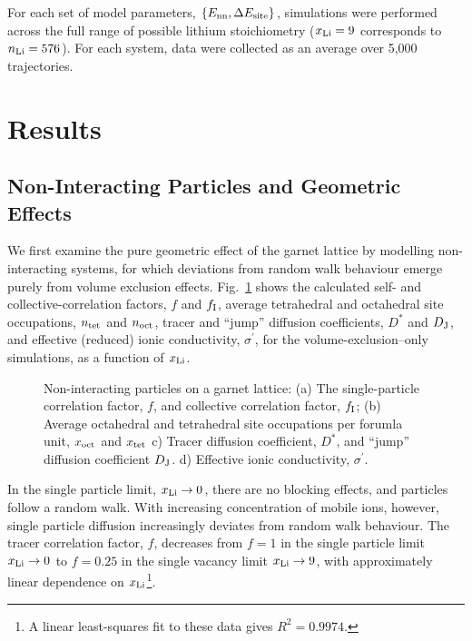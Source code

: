\documentclass[aps,prb,twocolumn,superscriptaddress,reprint]{revtex4-1}
\newcommand{\set}[1]{\left\{#1\right\}}
\newcommand{\xLi}{x_\m{Li}}
\begin{document}
For each set of model parameters, $\set{E_\m{nn}, \Delta E_\m{site}}$, simulations were performed across the full range of possible lithium stoichiometry ($\xLi=9$ corresponds to $n_{\mathrm{Li}}=576$). 
For each system, data were collected as an average over 5,000 trajectories. 

\section{Results}
\subsection{Non-Interacting Particles and Geometric Effects}
We first examine the pure geometric effect of the garnet lattice by modelling non-interacting systems, for which deviations from random walk behaviour emerge purely from volume exclusion effects. 
Fig.~\ref{fig:non-interacting_data} shows the calculated self- and collective-correlation factors, $f$ and $f_{\mathrm{I}}$, average tetrahedral and octahedral site occupations, $n_{\mathrm{tet}}$ and $n_{\mathrm{oct}}$, tracer and ``jump'' diffusion coefficients, $D^*$ and $D_{\mathrm{J}}$, and effective (reduced) ionic conductivity, $\sigma^\prime$, for the volume-exclusion--only simulations, as a function of $\xLi$.

\begin{figure}[tb]
  \centering
    \caption{\label{fig:non-interacting_data}Non-interacting particles on a garnet lattice: (a) The single-particle correlation factor, $f$, and collective correlation factor, $f_{\mathrm{I}}$; (b) Average octahedral and tetrahedral site occupations per forumla unit, $x_{\mathrm{oct}}$ and $x_{\mathrm{tet}}$ c) Tracer diffusion coefficient, $D^*$, and ``jump'' diffusion coefficient $D_{\mathrm{J}}$. d) Effective ionic conductivity, $\sigma^\prime$.}
\end{figure}

In the single particle limit, $\xLi\to0$, there are no blocking effects, and particles follow a random walk. 
With increasing concentration of mobile ions, however, single particle diffusion increasingly deviates from random walk behaviour. 
The tracer correlation factor, $f$, decreases from $f=1$ in the single particle limit $\xLi\to0$ to $f=0.25$ in the single vacancy limit $\xLi\to9$, with approximately linear dependence on $\xLi$\footnote{A linear least-squares fit to these data gives $R^2=0.9974$.}.
\end{document}
